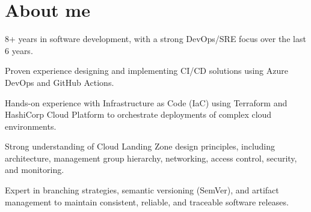 \documentclass[11pt]{deedy-resume-openfont}
\begin{document}
    
%
%
{}
%
%
\vspace{0.8cm}
\section{About me}
\vspace{0.4cm}
\begin{tightemize}
	\item 8+ years in software development, with a strong DevOps/SRE focus over the last 6 years.
	\item Proven experience designing and implementing CI/CD solutions using Azure DevOps and GitHub Actions.
	\item Hands-on experience with Infrastructure as Code (IaC) using Terraform and HashiCorp Cloud Platform to orchestrate deployments of complex cloud environments.
	\item Strong understanding of Cloud Landing Zone design principles, including architecture, management group hierarchy, networking, access control, security, and monitoring.
	\item Expert in branching strategies, semantic versioning (SemVer), and artifact management to maintain consistent, reliable, and traceable software releases.
\end{tightemize}
%
%
\vspace{0.8cm}
\end{document}
